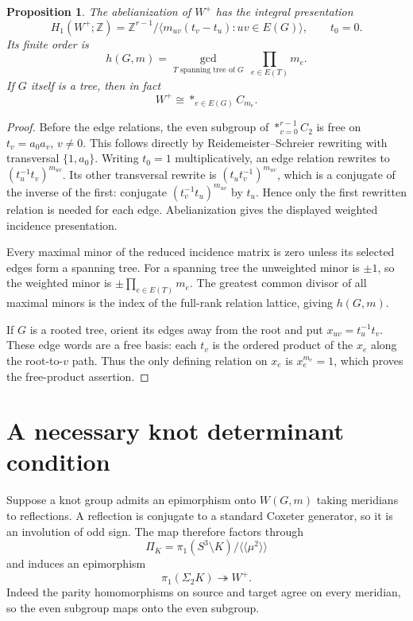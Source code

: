 \documentclass[11pt]{article}
\newtheorem{proposition}[theorem]{Proposition}
\newcommand{\Z}{\mathbb Z}
\begin{document}
\begin{proposition}\label{prop:weighted}
The abelianization of $W^+$ has the integral presentation
\[
 H_1(W^+;\Z)=\Z^{r-1}/
 \langle m_{uv}(t_v-t_u):uv\in E(G)\rangle,
 \qquad t_0=0.
\]
Its finite order is
\[
 h(G,m)=\gcd_{T\text{ spanning tree of }G}\ \prod_{e\in E(T)}m_e.
\]
If $G$ itself is a tree, then in fact
\[
                         W^+\cong *_{e\in E(G)} C_{m_e}.
\]
\end{proposition}
\begin{proof}
Before the edge relations, the even subgroup of $*_{v=0}^{r-1}C_2$
is free on $t_v=a_0a_v$, $v\ne0$.  This follows directly by
Reidemeister--Schreier rewriting with transversal $\{1,a_0\}$.
Writing $t_0=1$ multiplicatively, an edge relation rewrites to
$(t_u^{-1}t_v)^{m_{uv}}$.  Its other transversal rewrite is
$(t_u t_v^{-1})^{m_{uv}}$, which is a conjugate of the inverse
of the first: conjugate $(t_v^{-1}t_u)^{m_{uv}}$ by $t_u$.
Hence only the first rewritten relation is needed for each edge.
Abelianization gives the displayed weighted incidence presentation.

Every maximal minor of the reduced incidence matrix is zero unless
its selected edges form a spanning tree.  For a spanning tree the
unweighted minor is $\pm1$, so the weighted minor is
$\pm\prod_{e\in E(T)}m_e$.  The greatest common divisor of all
maximal minors is the index of the full-rank relation lattice,
giving $h(G,m)$.

If $G$ is a rooted tree, orient its edges away from the root and
put $x_{uv}=t_u^{-1}t_v$.  These edge words are a free basis:
each $t_v$ is the ordered product of the $x_e$ along the root-to-$v$
path.  Thus the only defining relation on $x_e$ is $x_e^{m_e}=1$,
which proves the free-product assertion.
\end{proof}

\section{A necessary knot determinant condition}

Suppose a knot group admits an epimorphism onto $W(G,m)$ taking
meridians to reflections.  A reflection is conjugate to a standard
Coxeter generator, so it is an involution of odd sign.  The map
therefore factors through
\[
 \Pi_K=\pi_1(S^3\setminus K)/\langle\!\langle\mu^2\rangle\!\rangle
\]
and induces an epimorphism
\[
                       \pi_1(\Sigma_2K)\twoheadrightarrow W^+.
\]
Indeed the parity homomorphisms on source and target agree on every
meridian, so the even subgroup maps onto the even subgroup.
\end{document}
